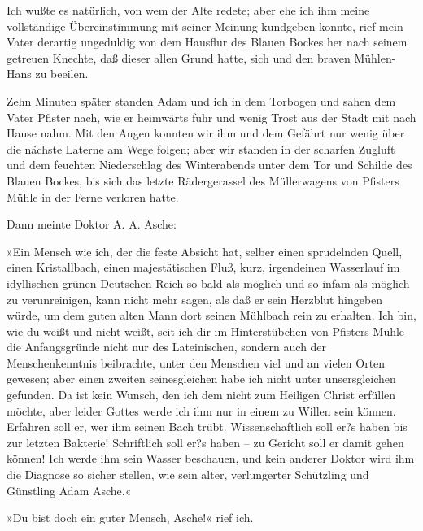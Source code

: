 Ich wußte es natürlich, von wem der Alte redete; aber ehe ich ihm
meine vollständige Übereinstimmung mit seiner Meinung kundgeben
konnte, rief mein Vater derartig ungeduldig von dem Hausflur des
Blauen Bockes her nach seinem getreuen Knechte, daß dieser allen
Grund hatte, sich und den braven Mühlen-Hans zu beeilen.

Zehn Minuten später standen Adam und ich in dem Torbogen und sahen
dem Vater Pfister nach, wie er heimwärts fuhr und wenig Trost aus
der Stadt mit nach Hause nahm. Mit den Augen konnten wir ihm und
dem Gefährt nur wenig über die nächste Laterne am Wege folgen; aber
wir standen in der scharfen Zugluft und dem feuchten Niederschlag
des Winterabends unter dem Tor und Schilde des Blauen Bockes, bis
sich das letzte Rädergerassel des Müllerwagens von Pfisters Mühle
in der Ferne verloren hatte.

Dann meinte Doktor A. A. Asche:

»Ein Mensch wie ich, der die feste Absicht hat, selber einen
sprudelnden Quell, einen Kristallbach, einen majestätischen Fluß,
kurz, irgendeinen Wasserlauf im idyllischen grünen Deutschen Reich
so bald als möglich und so infam als möglich zu verunreinigen, kann
nicht mehr sagen, als daß er sein Herzblut hingeben würde, um dem
guten alten Mann dort seinen Mühlbach rein zu erhalten. Ich bin,
wie du weißt und nicht weißt, seit ich dir im Hinterstübchen von
Pfisters Mühle die Anfangsgründe nicht nur des Lateinischen,
sondern auch der Menschenkenntnis beibrachte, unter den Menschen
viel und an vielen Orten gewesen; aber einen zweiten seinesgleichen
habe ich nicht unter unsersgleichen gefunden. Da ist kein Wunsch,
den ich dem nicht zum Heiligen Christ erfüllen möchte, aber leider
Gottes werde ich ihm nur in einem zu Willen sein können. Erfahren
soll er, wer ihm seinen Bach trübt. Wissenschaftlich soll er?s
haben bis zur letzten Bakterie! Schriftlich soll er?s haben – zu
Gericht soll er damit gehen können! Ich werde ihm sein Wasser
beschauen, und kein anderer Doktor wird ihm die Diagnose so sicher
stellen, wie sein alter, verlungerter Schützling und Günstling Adam
Asche.«

»Du bist doch ein guter Mensch, Asche!« rief ich.

